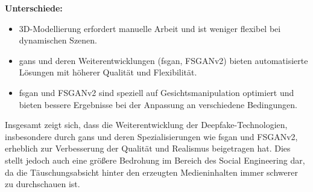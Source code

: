 \textbf{Unterschiede:}
\begin{itemize}
    \item 3D-Modellierung erfordert manuelle Arbeit und ist weniger flexibel bei dynamischen Szenen.
    \item \glspl{gan} und deren Weiterentwicklungen (\gls{fsgan}, FSGANv2) bieten automatisierte Lösungen mit höherer Qualität und Flexibilität.
    \item \gls{fsgan} und FSGANv2 sind speziell auf Gesichtsmanipulation optimiert und bieten bessere Ergebnisse bei der Anpassung an verschiedene Bedingungen\cite{Deepfakes-a-survey-and-introduction-to-the-topical-collection}.
\end{itemize}

Insgesamt zeigt sich, dass die Weiterentwicklung der Deepfake-Technologien, insbesondere durch \glspl{gan} und deren Spezialisierungen wie \gls{fsgan} und FSGANv2, erheblich zur Verbesserung der Qualität und Realismus beigetragen hat.
Dies stellt jedoch auch eine größere Bedrohung im Bereich des Social Engineering dar, da die Täuschungsabsicht hinter den erzeugten Medieninhalten immer schwerer zu durchschauen ist.

